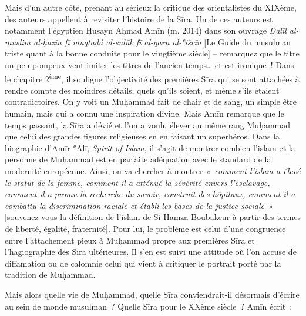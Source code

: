 Mais d'un autre côté, prenant au sérieux la critique des orientalistes
du XIXème, des auteurs appellent à revisiter l'histoire de la Sīra. Un
de ces auteurs est notamment l'égyptien Ḥusayn Aḥmad Amīn (m. 2014) dans
son ouvrage \emph{Dalīl al-muslim al-ḥazīn fī muqtaḍá al-sulūk fī
al-qarn al-ʿišrīn} {[}Le Guide du musulman triste quant à la bonne
conduite pour le vingtième siècle{]} -- remarquez que le titre un peu
pompeux veut imiter les titres de l'ancien temps\ldots{} et est
ironique~! Dans le chapitre
2\textsuperscript{ème}, il souligne l'objectivité des premières Sīra qui
se sont attachées à rendre compte des moindres détails, quels qu'ils
soient, et même s'ils étaient contradictoires. On y voit un Muḥammad
fait de chair et de sang, un simple être humain, mais qui a connu une
inspiration divine. Mais Amīn remarque que le temps passant, la Sīra a
dévié et l'on a voulu élever au même rang Muḥammad que celui des grandes
figures religieuses en en faisant un superhéros. Dans la biographie
d'Amīr ʿAlī, \emph{Spirit of Islam}, il s'agit de montrer combien
l'islam et la personne de Muḥammad est en parfaite adéquation avec le
standard de la modernité européenne. Ainsi, on va chercher à montrer
\emph{«~comment l'islam a élevé le statut de la femme, comment il a
atténué la sévérité envers l'esclavage, comment il a promu la recherche
du savoir, construit des hôpitaux, comment il a combattu la
discrimination raciale et établi les bases de la justice sociale~}»
{[}souvenez-vous la définition de l'islam de Si Hamza Boubakeur à partir
des termes de liberté, égalité, fraternité{]}. Pour lui, le problème est
celui d'une congruence entre l'attachement pieux à Muḥammad propre aux
premières Sīra et l'hagiographie des Sīra ultérieures. Il s'en est suivi
une attitude où l'on accuse de diffamation ou de calomnie celui qui
vient à critiquer le portrait porté par la tradition de Muḥammad.

Mais alors quelle vie de Muḥammad, quelle Sīra conviendrait-il désormais
d'écrire au sein de monde musulman~? Quelle Sīra pour le XXème siècle~?
Amīn écrit~:

